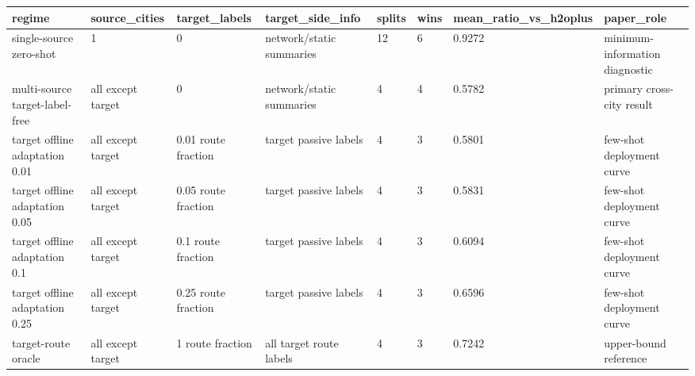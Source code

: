 \begin{tabular}{llllllll}
\toprule
regime & source\_cities & target\_labels & target\_side\_info & splits & wins & mean\_ratio\_vs\_h2oplus & paper\_role \\
\midrule
single-source zero-shot & 1 & 0 & network/static summaries & 12 & 6 & 0.9272 & minimum-information diagnostic \\
multi-source target-label-free & all except target & 0 & network/static summaries & 4 & 4 & 0.5782 & primary cross-city result \\
target offline adaptation 0.01 & all except target & 0.01 route fraction & target passive labels & 4 & 3 & 0.5801 & few-shot deployment curve \\
target offline adaptation 0.05 & all except target & 0.05 route fraction & target passive labels & 4 & 3 & 0.5831 & few-shot deployment curve \\
target offline adaptation 0.1 & all except target & 0.1 route fraction & target passive labels & 4 & 3 & 0.6094 & few-shot deployment curve \\
target offline adaptation 0.25 & all except target & 0.25 route fraction & target passive labels & 4 & 3 & 0.6596 & few-shot deployment curve \\
target-route oracle & all except target & 1 route fraction & all target route labels & 4 & 3 & 0.7242 & upper-bound reference \\
\bottomrule
\end{tabular}
